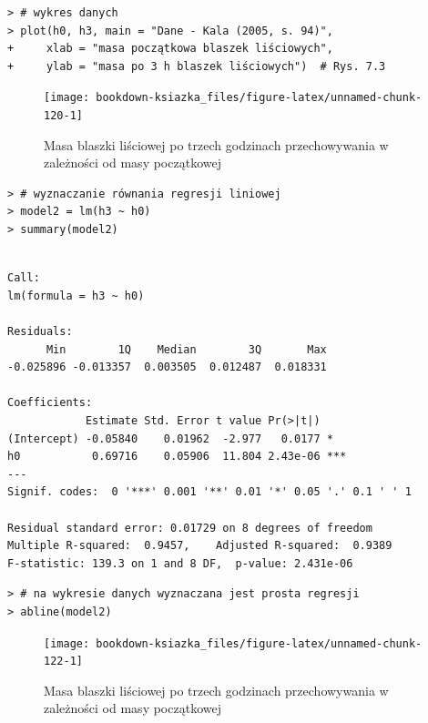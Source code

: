 \documentclass[12pt,B5paper,]{book}
\begin{document}
\begin{verbatim}
> # wykres danych
> plot(h0, h3, main = "Dane - Kala (2005, s. 94)", 
+     xlab = "masa początkowa blaszek liściowych", 
+     ylab = "masa po 3 h blaszek liściowych")  # Rys. 7.3
\end{verbatim}

\begin{figure}[H]

{\centering \texttt{[image: bookdown-ksiazka\_files/figure-latex/unnamed-chunk-120-1]} 

}

\caption{Masa blaszki liściowej po trzech godzinach przechowywania w zależności od masy początkowej}\label{fig:unnamed-chunk-120}
\end{figure}

\begin{verbatim}
> # wyznaczanie równania regresji liniowej
> model2 = lm(h3 ~ h0)
> summary(model2)
\end{verbatim}

\begin{verbatim}

Call:
lm(formula = h3 ~ h0)

Residuals:
      Min        1Q    Median        3Q       Max 
-0.025896 -0.013357  0.003505  0.012487  0.018331 

Coefficients:
            Estimate Std. Error t value Pr(>|t|)    
(Intercept) -0.05840    0.01962  -2.977   0.0177 *  
h0           0.69716    0.05906  11.804 2.43e-06 ***
---
Signif. codes:  0 '***' 0.001 '**' 0.01 '*' 0.05 '.' 0.1 ' ' 1

Residual standard error: 0.01729 on 8 degrees of freedom
Multiple R-squared:  0.9457,    Adjusted R-squared:  0.9389 
F-statistic: 139.3 on 1 and 8 DF,  p-value: 2.431e-06
\end{verbatim}

\begin{verbatim}
> # na wykresie danych wyznaczana jest prosta regresji
> abline(model2)
\end{verbatim}

\begin{figure}[H]

{\centering \texttt{[image: bookdown-ksiazka\_files/figure-latex/unnamed-chunk-122-1]} 

}

\caption{Masa blaszki liściowej po trzech godzinach przechowywania w zależności od masy początkowej}\label{fig:unnamed-chunk-122}
\end{figure}
\end{document}
